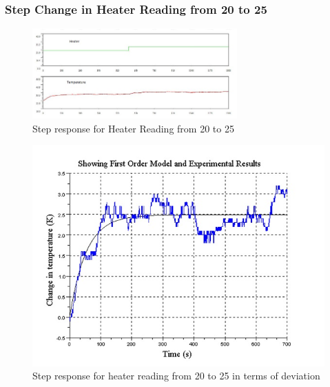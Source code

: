 \subsubsection{Step Change in Heater Reading from 20 to 25}
\begin{figure}[h]
\centering
	\includegraphics[width = 0.7\textwidth]{Vikas_self/report_tex/parameter_estimation/20to25.jpg}
		\caption{Step response for Heater Reading from 20 to 25}
	\label{fig:20to25}
\end{figure}
%
\begin{figure}[h]
\centering
	\includegraphics[width = .7\textwidth]{Vikas_self/report_tex/parameter_estimation/optimized20to25.jpg}
		\caption{Step response for heater reading from 20 to 25 in terms of deviation}
	\label{optimized20to25}
\end{figure}
\newpage
